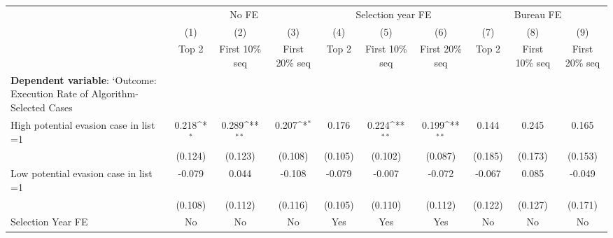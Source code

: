 {
\def\sym#1{\ifmmode^{#1}\else\(^{#1}\)\fi}
\begin{tabular}{l*{9}{c}}
\toprule
            &\multicolumn{3}{c}{No FE}                                        &\multicolumn{3}{c}{Selection year FE}                            &\multicolumn{3}{c}{Bureau FE}                                    \\\cmidrule(lr){2-4}\cmidrule(lr){5-7}\cmidrule(lr){8-10}
            &\multicolumn{1}{c}{(1)}&\multicolumn{1}{c}{(2)}&\multicolumn{1}{c}{(3)}&\multicolumn{1}{c}{(4)}&\multicolumn{1}{c}{(5)}&\multicolumn{1}{c}{(6)}&\multicolumn{1}{c}{(7)}&\multicolumn{1}{c}{(8)}&\multicolumn{1}{c}{(9)}\\
            &\multicolumn{1}{c}{Top 2}&\multicolumn{1}{c}{First 10\% seq}&\multicolumn{1}{c}{First 20\% seq}&\multicolumn{1}{c}{Top 2}&\multicolumn{1}{c}{First 10\% seq}&\multicolumn{1}{c}{First 20\% seq}&\multicolumn{1}{c}{Top 2}&\multicolumn{1}{c}{First 10\% seq}&\multicolumn{1}{c}{First 20\% seq}\\
\midrule
\textbf{Dependent variable}: `Outcome: Execution Rate of Algorithm-Selected Cases&                     &                     &                     &                     &                     &                     &                     &                     &                     \\
\addlinespace
High potential evasion case in list =1&       0.218\sym{*}  &       0.289\sym{**} &       0.207\sym{*}  &       0.176         &       0.224\sym{**} &       0.199\sym{**} &       0.144         &       0.245         &       0.165         \\
            &     (0.124)         &     (0.123)         &     (0.108)         &     (0.105)         &     (0.102)         &     (0.087)         &     (0.185)         &     (0.173)         &     (0.153)         \\
\addlinespace
Low potential evasion case in list =1&      -0.079         &       0.044         &      -0.108         &      -0.079         &      -0.007         &      -0.072         &      -0.067         &       0.085         &      -0.049         \\
            &     (0.108)         &     (0.112)         &     (0.116)         &     (0.105)         &     (0.110)         &     (0.112)         &     (0.122)         &     (0.127)         &     (0.171)         \\
\midrule
Selection Year FE&          No         &          No         &          No         &         Yes         &         Yes         &         Yes         &          No         &          No         &          No         \\

\end{tabular}}
